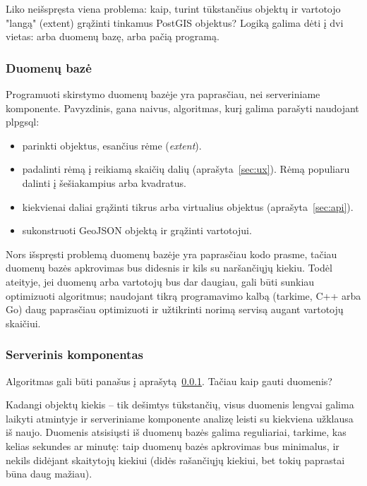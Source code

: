 \documentclass{article}
\begin{document}
Liko neišspręsta viena problema: kaip, turint tūkstančius objektų ir vartotojo
"langą" (extent) grąžinti tinkamus PostGIS objektus? Logiką galima dėti į dvi
vietas: arba duomenų bazę, arba pačią programą.

\subsubsection{Duomenų bazė}
\label{sec:db}

Programuoti skirstymo duomenų bazėje yra paprasčiau, nei serveriniame
komponente. Pavyzdinis, gana naivus, algoritmas, kurį galima parašyti naudojant
plpgsql:

\begin{itemize}
    \item parinkti objektus, esančius rėme ({\em extent}).
    \item padalinti rėmą į reikiamą skaičių dalių (aprašyta~\ref{sec:ux}). Rėmą
        populiaru dalinti į šešiakampius arba kvadratus.

    \item kiekvienai daliai grąžinti tikrus arba virtualius objektus
        (aprašyta~\ref{sec:api}).

    \item sukonstruoti GeoJSON objektą ir grąžinti vartotojui.
\end{itemize}

Nors išspręsti problemą duomenų bazėje yra paprasčiau kodo prasme, tačiau
duomenų bazės apkrovimas bus didesnis ir kils su naršančiųjų kiekiu. Todėl
ateityje, jei duomenų arba vartotojų bus dar daugiau, gali būti sunkiau
optimizuoti algoritmus; naudojant tikrą programavimo kalbą (tarkime, C++ arba
Go) daug paprasčiau optimizuoti ir užtikrinti norimą servisą augant vartotojų
skaičiui.

\subsubsection{Serverinis komponentas}
\label{sec:backend}

Algoritmas gali būti panašus į aprašytą~\ref{sec:db}. Tačiau kaip gauti
duomenis?

Kadangi objektų kiekis -- tik dešimtys tūkstančių, visus duomenis lengvai
galima laikyti atmintyje ir serveriniame komponente analizę leisti su kiekviena
užklausa iš naujo. Duomenis atsisiųsti iš duomenų bazės galima reguliariai,
tarkime, kas kelias sekundes ar minutę: taip duomenų bazės apkrovimas bus
minimalus, ir nekils didėjant skaitytojų kiekiui (didės rašančiųjų kiekiui, bet
tokių paprastai būna daug mažiau).
\end{document}
